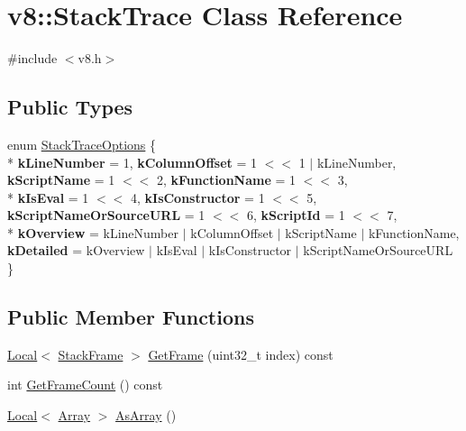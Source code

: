 \hypertarget{classv8_1_1_stack_trace}{}\section{v8\+:\+:Stack\+Trace Class Reference}
\label{classv8_1_1_stack_trace}


{\ttfamily \#include $<$v8.\+h$>$}

\subsection*{Public Types}
\begin{DoxyCompactItemize}
\item 
enum \hyperlink{classv8_1_1_stack_trace_a9704e4a37949eb8eb8ccddbddf161492}{Stack\+Trace\+Options} \{ \\*
{\bfseries k\+Line\+Number} = 1, 
{\bfseries k\+Column\+Offset} = 1 $<$$<$ 1 $\vert$ k\+Line\+Number, 
{\bfseries k\+Script\+Name} = 1 $<$$<$ 2, 
{\bfseries k\+Function\+Name} = 1 $<$$<$ 3, 
\\*
{\bfseries k\+Is\+Eval} = 1 $<$$<$ 4, 
{\bfseries k\+Is\+Constructor} = 1 $<$$<$ 5, 
{\bfseries k\+Script\+Name\+Or\+Source\+U\+R\+L} = 1 $<$$<$ 6, 
{\bfseries k\+Script\+Id} = 1 $<$$<$ 7, 
\\*
{\bfseries k\+Overview} = k\+Line\+Number $\vert$ k\+Column\+Offset $\vert$ k\+Script\+Name $\vert$ k\+Function\+Name, 
{\bfseries k\+Detailed} = k\+Overview $\vert$ k\+Is\+Eval $\vert$ k\+Is\+Constructor $\vert$ k\+Script\+Name\+Or\+Source\+U\+R\+L
 \}
\end{DoxyCompactItemize}
\subsection*{Public Member Functions}
\begin{DoxyCompactItemize}
\item 
\hyperlink{classv8_1_1_local}{Local}$<$ \hyperlink{classv8_1_1_stack_frame}{Stack\+Frame} $>$ \hyperlink{classv8_1_1_stack_trace_a6fd5ba809b5d87032d70d32f0b1a80e8}{Get\+Frame} (uint32\+\_\+t index) const 
\item 
int \hyperlink{classv8_1_1_stack_trace_aafafebce6c034f1f6f4a870e8f52431e}{Get\+Frame\+Count} () const 
\item 
\hyperlink{classv8_1_1_local}{Local}$<$ \hyperlink{classv8_1_1_array}{Array} $>$ \hyperlink{classv8_1_1_stack_trace_abd36f712b3ab986b572aa259b06bf5bd}{As\+Array} ()
\end{DoxyCompactItemize}
